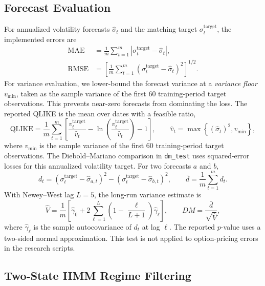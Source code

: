 \documentclass[journal]{IEEEtran}
\begin{document}
\subsection{Forecast Evaluation}

For annualized volatility forecasts $\widehat\sigma_t$ and the matching target $\sigma^{\mathrm{target}}_t$, the implemented errors are
\begin{equation}
\begin{aligned}
\mathrm{MAE}&=\frac{1}{m}\sum_{t=1}^{m}\left|\sigma^{\mathrm{target}}_t-\widehat\sigma_t\right|,\\
\mathrm{RMSE}&=\left[\frac{1}{m}\sum_{t=1}^{m}(\sigma^{\mathrm{target}}_t-\widehat\sigma_t)^2\right]^{1/2}.
\end{aligned}
\end{equation}
For variance evaluation, we lower-bound the forecast variance at a \emph{variance floor} $v_{\min}$, taken as the sample variance of the first 60 training-period target observations. This prevents near-zero forecasts from dominating the loss. The reported QLIKE is the mean over dates with a feasible ratio,
\begin{equation}
\mathrm{QLIKE}=\frac{1}{m}\sum_{t=1}^{m}\left[
\frac{v^{\mathrm{target}}_t}{\widehat v_t}
-\ln\left(\frac{v^{\mathrm{target}}_t}{\widehat v_t}\right)-1\right],
\qquad \widehat v_t=\max\left\{(\widehat\sigma_t)^2, v_{\min}\right\},
\end{equation}
where $v_{\min}$ is the sample variance of the first 60
training-period target observations.
The Diebold--Mariano comparison in \texttt{dm\_test} uses squared-error losses for this annualized volatility target. For two forecasts $a$ and $b$,
\begin{equation}
d_t=(\sigma^{\mathrm{target}}_t-\widehat\sigma_{a,t})^2-(\sigma^{\mathrm{target}}_t-\widehat\sigma_{b,t})^2,
\qquad \bar d=\frac{1}{m}\sum_{t=1}^{m}d_t.
\end{equation}
With Newey--West lag $L=5$, the long-run variance estimate is
\begin{equation}
\widehat V=\frac{1}{m}\left[\widehat\gamma_0+2\sum_{\ell=1}^{L}\left(1-\frac{\ell}{L+1}\right)\widehat\gamma_\ell\right],
\qquad DM=\frac{\bar d}{\sqrt{\widehat V}},
\end{equation}
where $\widehat\gamma_\ell$ is the sample autocovariance of $d_t$ at lag $\ell$. The reported $p$-value uses a two-sided normal approximation. This test is not applied to option-pricing errors in the research scripts.

\subsection{Two-State HMM Regime Filtering}
\end{document}
